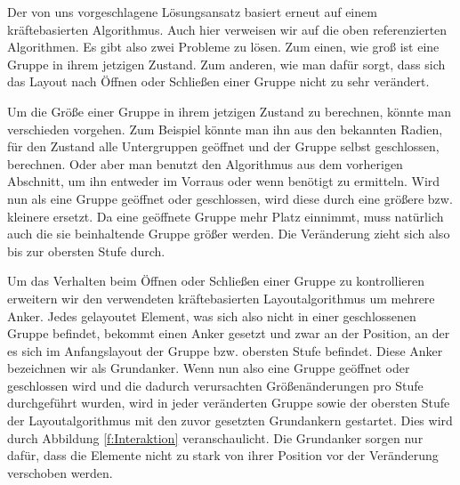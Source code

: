 Der von uns vorgeschlagene Lösungsansatz basiert erneut auf einem kräftebasierten Algorithmus. 
Auch hier verweisen wir auf die oben referenzierten Algorithmen. Es gibt also zwei Probleme zu lösen. 
Zum einen, wie groß ist eine Gruppe in ihrem jetzigen Zustand.  
Zum anderen, wie man dafür sorgt, dass sich das Layout nach Öffnen oder Schließen einer Gruppe nicht zu sehr verändert.

Um die Größe einer Gruppe in ihrem jetzigen Zustand zu berechnen, könnte man verschieden vorgehen. 
Zum Beispiel könnte man ihn aus den bekannten Radien, für den Zustand alle Untergruppen geöffnet und der Gruppe selbst geschlossen, berechnen. 
Oder aber man benutzt den Algorithmus aus dem vorherigen Abschnitt, um ihn entweder im Vorraus oder wenn benötigt zu ermitteln. 
Wird nun als eine Gruppe geöffnet oder geschlossen, wird diese durch eine größere bzw. kleinere ersetzt. 
Da eine geöffnete Gruppe mehr Platz einnimmt, muss natürlich auch die sie beinhaltende Gruppe größer werden. 
Die Veränderung zieht sich also bis zur obersten Stufe durch.

Um das Verhalten beim Öffnen oder Schließen einer Gruppe zu kontrollieren erweitern wir den verwendeten kräftebasierten Layoutalgorithmus um mehrere Anker. 
Jedes gelayoutet Element, was sich also nicht in einer geschlossenen Gruppe befindet, bekommt einen Anker gesetzt und zwar an der Position, 
an der es sich im Anfangslayout der Gruppe bzw. obersten Stufe befindet. 
Diese Anker bezeichnen wir als Grundanker. 
Wenn nun also eine Gruppe geöffnet oder geschlossen wird und die dadurch verursachten Größenänderungen pro Stufe durchgeführt wurden, 
wird in jeder veränderten Gruppe sowie der obersten Stufe der Layoutalgorithmus mit den zuvor gesetzten Grundankern gestartet. 
Dies wird  durch Abbildung \ref{f:Interaktion} veranschaulicht. Die Grundanker sorgen nur dafür, dass die Elemente nicht zu stark von ihrer Position vor der Veränderung verschoben werden.

